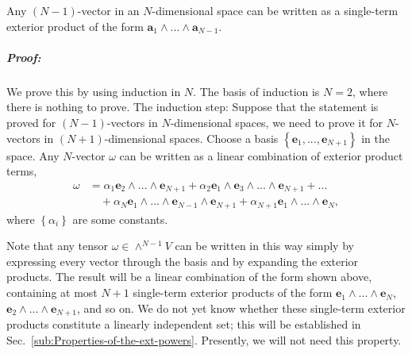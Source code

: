 Any $(N-1)$-vector in an $N$-dimen\-sion\-al space can be written
as a single-term exterior product of the form $\mathbf{a}_{1}\wedge...\wedge\mathbf{a}_{N-1}$.


\subparagraph{Proof:}

We prove this by using induction in $N$. The basis of induction is
$N=2$, where there is nothing to prove. The induction step: Suppose
that the statement is proved for $(N-1)$-vectors in $N$-dimen\-sion\-al
spaces, we need to prove it for $N$-vectors in $(N+1)$-dimen\-sion\-al
spaces. Choose a basis $\left\{ \mathbf{e}_{1},...,\mathbf{e}_{N+1}\right\} $
in the space. Any $N$-vector $\omega$ can be written as a linear
combination of exterior product terms,\begin{align*}
\omega & =\alpha_{1}\mathbf{e}_{2}\wedge...\wedge\mathbf{e}_{N+1}+\alpha_{2}\mathbf{e}_{1}\wedge\mathbf{e}_{3}\wedge...\wedge\mathbf{e}_{N+1}+...\\
 & \quad+\alpha_{N}\mathbf{e}_{1}\wedge...\wedge\mathbf{e}_{N-1}\wedge\mathbf{e}_{N+1}+\alpha_{N+1}\mathbf{e}_{1}\wedge...\wedge\mathbf{e}_{N},\end{align*}
where $\left\{ \alpha_{i}\right\} $ are some constants. 

Note that any tensor $\omega\in\wedge^{N-1}V$ can be written in this
way simply by expressing every vector through the basis and by expanding
the exterior products. The result will be a linear combination of
the form shown above, containing at most $N+1$ single-term exterior
products of the form $\mathbf{e}_{1}\wedge...\wedge\mathbf{e}_{N}$,
$\mathbf{e}_{2}\wedge...\wedge\mathbf{e}_{N+1}$, and so on. We do
not yet know whether these single-term exterior products constitute
a linearly independent set; this will be established in Sec.~\ref{sub:Properties-of-the-ext-powers}.
Presently, we will not need this property.

